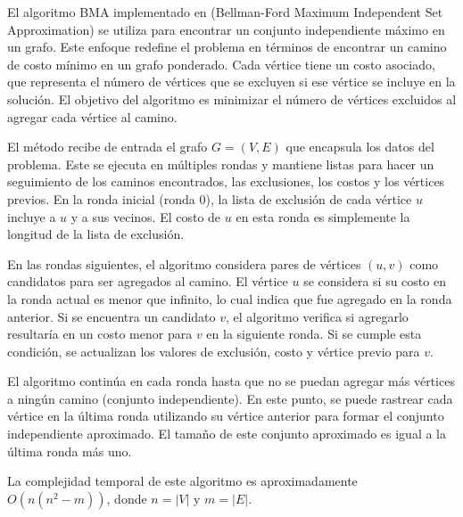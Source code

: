 \documentclass[10pt]{article} %
\begin{document}
	El algoritmo BMA implementado en \cite{bellman-ford} (Bellman-Ford Maximum Independent Set Approximation) se utiliza para encontrar un conjunto independiente máximo en un grafo. Este enfoque redefine el problema en términos de encontrar un camino de costo mínimo en un grafo ponderado. Cada vértice tiene un costo asociado, que representa el número de vértices que se excluyen si ese vértice se incluye en la solución. El objetivo del algoritmo es minimizar el número de vértices excluidos al agregar cada vértice al camino.
	
	El m\'etodo recibe de entrada el grafo $G=(V, E)$ que encapsula los datos del problema. Este se ejecuta en múltiples rondas y mantiene listas para hacer un seguimiento de los caminos encontrados, las exclusiones, los costos y los vértices previos. En la ronda inicial (ronda 0), la lista de exclusión de cada vértice $u$ incluye a $u$ y a sus vecinos. El costo de $u$ en esta ronda es simplemente la longitud de la lista de exclusión.
	
	En las rondas siguientes, el algoritmo considera pares de vértices $(u, v)$ como candidatos para ser agregados al camino. El vértice $u$ se considera si su costo en la ronda actual es menor que infinito, lo cual indica que fue agregado en la ronda anterior. Si se encuentra un candidato $v$, el algoritmo verifica si agregarlo resultaría en un costo menor para $v$ en la siguiente ronda. Si se cumple esta condición, se actualizan los valores de exclusión, costo y vértice previo para $v$.
	
	El algoritmo continúa en cada ronda hasta que no se puedan agregar más vértices a ningún camino (conjunto independiente). En este punto, se puede rastrear cada vértice en la última ronda utilizando su vértice anterior para formar el conjunto independiente aproximado. El tamaño de este conjunto aproximado es igual a la última ronda más uno. 
	
	La complejidad temporal de este algoritmo es aproximadamente $O(n(n^2-m))$, donde $n = |V|$ y $m = |E|$.
	
\end{document}
